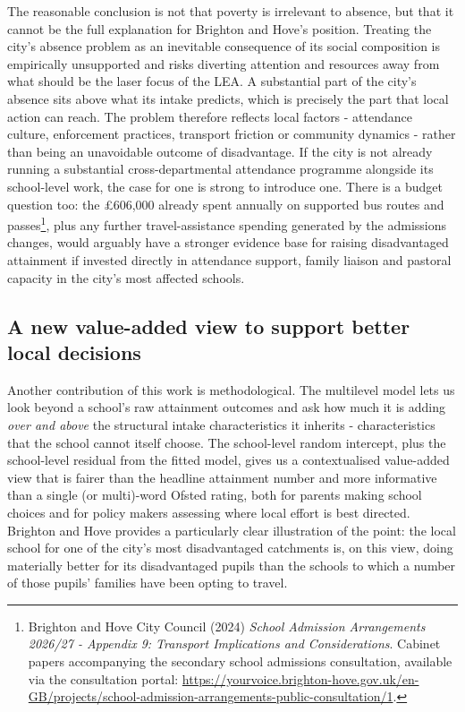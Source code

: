\documentclass[
  12pt,
  titlepage]{article}
\begin{document}
The reasonable conclusion is not that poverty is irrelevant to absence,
but that it cannot be the full explanation for Brighton and Hove's
position. Treating the city's absence problem as an inevitable
consequence of its social composition is empirically unsupported and
risks diverting attention and resources away from what should be the
laser focus of the LEA. A substantial part of the city's absence sits
above what its intake predicts, which is precisely the part that local
action can reach. The problem therefore reflects local factors -
attendance culture, enforcement practices, transport friction or
community dynamics - rather than being an unavoidable outcome of
disadvantage. If the city is not already running a substantial
cross-departmental attendance programme alongside its school-level work,
the case for one is strong to introduce one. There is a budget question
too: the £606,000 already spent annually on supported bus routes and
passes\footnote{Brighton and Hove City Council (2024) \emph{School
  Admission Arrangements 2026/27 - Appendix 9: Transport Implications
  and Considerations}. Cabinet papers accompanying the secondary school
  admissions consultation, available via the consultation portal:
  \url{https://yourvoice.brighton-hove.gov.uk/en-GB/projects/school-admission-arrangements-public-consultation/1}.},
plus any further travel-assistance spending generated by the admissions
changes, would arguably have a stronger evidence base for raising
disadvantaged attainment if invested directly in attendance support,
family liaison and pastoral capacity in the city's most affected
schools.

\subsection{A new value-added view to support better local
decisions}\label{a-new-value-added-view-to-support-better-local-decisions}

Another contribution of this work is methodological. The multilevel
model lets us look beyond a school's raw attainment outcomes and ask how
much it is adding \emph{over and above} the structural intake
characteristics it inherits - characteristics that the school cannot
itself choose. The school-level random intercept, plus the school-level
residual from the fitted model, gives us a contextualised value-added
view that is fairer than the headline attainment number and more
informative than a single (or multi)-word Ofsted rating, both for
parents making school choices and for policy makers assessing where
local effort is best directed. Brighton and Hove provides a particularly
clear illustration of the point: the local school for one of the city's
most disadvantaged catchments is, on this view, doing materially better
for its disadvantaged pupils than the schools to which a number of those
pupils' families have been opting to travel.
\end{document}
